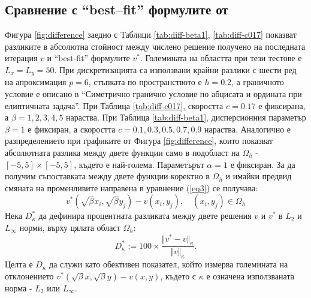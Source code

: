 \documentclass{article}
\newcommand{\be}{\begin{equation}}
\newcommand{\ee}{\end{equation}}
\newcommand{\rf}[1]{(\ref{#1})}
\begin{document}
\subsection{Сравнение с ``best--fit'' формулите от \cite{Ch2011} }
Фигура \ref{fig:difference} заедно с Таблици \ref{tab:diff-beta1}, \ref{tab:diff-c017} показват разликите в абсолютна стойност между числено решение получено на последната итерация $v$ и ``best-fit'' формулите $v^*$. Големината на областта при тези тестове е $L_x = L_y = 50$. При дискретизацията са използвани крайни разлики с шести ред на апроксимация $p=6$, стъпката по пространството е $h=0.2$, а граничното условие е описано в ``Симетрично гранично условие по абцисата и ордината при елиптичната задача''. При Таблица \ref{tab:diff-c017}, скоростта $c = 0.17$ е фиксирана, а $\beta=1, 2, 3, 4, 5$ нараства. При Таблица \ref{tab:diff-beta1}, дисперсионния параметър $\beta=1$ е фиксиран, а скоростта $c = 0.1, 0.3, 0.5, 0.7, 0.9$ нараства. Аналогично е разпределението при графиките от Фигура \ref{fig:difference}, които показват абсолютната разлика между двете функции само в подобласт на $\Omega_h$ - $[-5,  5] \times [-5,5]$, където е най-голема. Параметърът $\alpha = 1$ е фиксиран. За да получим съпоставката между двете функции коректно в $\Omega_h$ и имайки предвид смяната на променливите направена в уравнение \rf{eq3} се получава:
\be
v^*\left(\sqrt{\beta}x_i,\sqrt{\beta}y_j\right)-v(x_i,y_j), \quad (x_i,y_j) \in \Omega_h
\ee
Нека $D^*_{\kappa}$ да дефинира процентната разликата между двете решения $v$ и $v^*$ в ${L_2 }$ и ${L_\infty}$ норми, върху цялата област $\Omega_h$:
\be\label{diffvv}
D^*_{\kappa} := 100 \times \frac{\Vert v^*-v \Vert_{\kappa} }{ \Vert v \Vert_{\kappa} }.
\ee
Целта е $D_{\kappa}$ да служи като обективен показател, който измерва големината на отклонението $v^*(\sqrt{\beta}x,\sqrt{\beta}y)-v(x,y)$, където с $\kappa$ е означена използваната норма - ${L_2 }$ или ${L_\infty}$.
\end{document}
